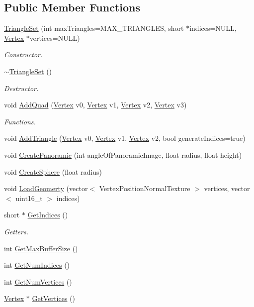 \subsection*{Public Member Functions}
\begin{DoxyCompactItemize}
\item 
\hyperlink{class_triangle_set_af476769901923751b75c28b3fb405287}{Triangle\+Set} (int max\+Triangles=M\+A\+X\+\_\+\+T\+R\+I\+A\+N\+G\+L\+ES, short $\ast$indices=N\+U\+LL, \hyperlink{class_vertex}{Vertex} $\ast$vertices=N\+U\+LL)
\begin{DoxyCompactList}\small\item\em Constructor. \end{DoxyCompactList}\item 
\hyperlink{class_triangle_set_a04eaa39a57ece1a96c853eed01d54b88}{$\sim$\+Triangle\+Set} ()
\begin{DoxyCompactList}\small\item\em Destructor. \end{DoxyCompactList}\item 
void \hyperlink{class_triangle_set_a272ae3bd26d941b6e1a902ef7333bbb1}{Add\+Quad} (\hyperlink{class_vertex}{Vertex} v0, \hyperlink{class_vertex}{Vertex} v1, \hyperlink{class_vertex}{Vertex} v2, \hyperlink{class_vertex}{Vertex} v3)
\begin{DoxyCompactList}\small\item\em Functions. \end{DoxyCompactList}\item 
void \hyperlink{class_triangle_set_a2207831afe53a8bb3298d661391a1418}{Add\+Triangle} (\hyperlink{class_vertex}{Vertex} v0, \hyperlink{class_vertex}{Vertex} v1, \hyperlink{class_vertex}{Vertex} v2, bool generate\+Indices=true)
\item 
void \hyperlink{class_triangle_set_a3482e212da7004ff55c6d087047904db}{Create\+Panoramic} (int angle\+Of\+Panoramic\+Image, float radius, float height)
\item 
void \hyperlink{class_triangle_set_ac5bc6b68fa1118e12900f0d2638e2b5a}{Create\+Sphere} (float radius)
\item 
void \hyperlink{class_triangle_set_a95c9d8f500a7facd53d2af30cd7104be}{Load\+Geomerty} (vector$<$ Vertex\+Position\+Normal\+Texture $>$ vertices, vector$<$ uint16\+\_\+t $>$ indices)
\item 
short $\ast$ \hyperlink{class_triangle_set_af7318e823cda708835e3b47ce83bae23}{Get\+Indices} ()
\begin{DoxyCompactList}\small\item\em Getters. \end{DoxyCompactList}\item 
int \hyperlink{class_triangle_set_a23da7e4699bc2e22664c000fac27a962}{Get\+Max\+Buffer\+Size} ()
\item 
int \hyperlink{class_triangle_set_a8cda203213cce0f4edb87226daf1ef1e}{Get\+Num\+Indices} ()
\item 
int \hyperlink{class_triangle_set_ae4999e314948b3fe30ade2299a5b815d}{Get\+Num\+Vertices} ()
\item 
\hyperlink{class_vertex}{Vertex} $\ast$ \hyperlink{class_triangle_set_affe9e0e2d4f07f6b728e9d51e21a6087}{Get\+Vertices} ()
\end{DoxyCompactItemize}
